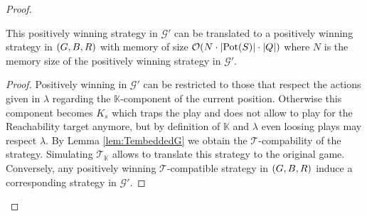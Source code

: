 \begin{proof}
\begin{lemma}
    This positively winning strategy in 
    $\mathcal{G'}$ can be translated to a positively winning strategy in 
    $\left(G, B, R\right)$ with memory of size 
    $\mathcal{O}(N\cdot\left\vert{\operatorname{Pot}(S)}\right\vert\cdot\left\vert{Q}\right\vert)$ where $N$ is the memory
    size of the positively winning strategy in $\mathcal{G'}$.
  \end{lemma}
  \begin{proof}
    Positively winning in $\mathcal{G'}$ can be restricted to those that 
    respect the actions given in $\lambda$ regarding the $\mathbb{K}$-component 
    of the current position. Otherwise this component becomes $K_{s}$ which 
    traps the play and does not allow to play for the Reachability target 
    anymore, but by definition of $\mathbb{K}$ and $\lambda$ even loosing plays
    may respect $\lambda$. By Lemma \ref{lem:TembeddedG} we obtain the 
    $\mathcal{T}$-compability of the strategy. Simulating 
    $\mathcal{T}_{\mathbb{K}}$ allows to translate this strategy to the 
    original game. Conversely, any positively winning $\mathcal{T}$-compatible 
    strategy in $\left(G, B, R\right)$ induce a corresponding strategy in 
    $\mathcal{G'}$.
  \end{proof}
\end{proof}
